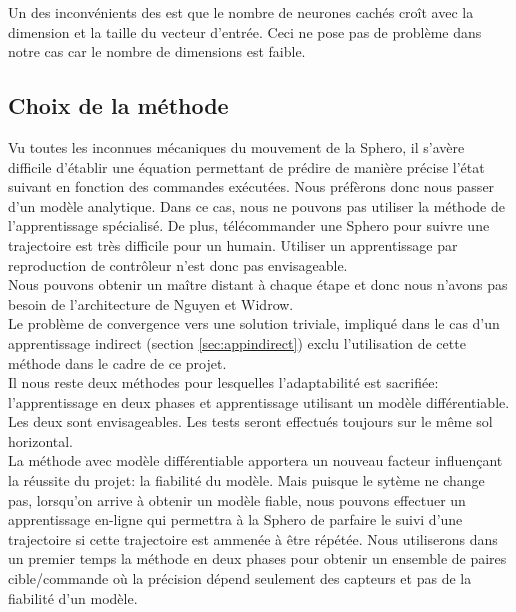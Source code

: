 \documentclass[12pt,a4paper,oneside, titlepage]{article}
\begin{document}
Un des inconvénients des \rbf est que le nombre de neurones cachés croît avec la dimension et la taille du vecteur d'entrée.
Ceci ne pose pas de problème dans notre cas car le nombre de dimensions est faible.

\subsection{Choix de la méthode}
Vu toutes les inconnues mécaniques du mouvement de la Sphero, il s'avère difficile d'établir une équation permettant de prédire de manière précise l'état suivant en fonction des commandes exécutées.
Nous préfèrons donc nous passer d'un modèle analytique.
Dans ce cas, nous ne pouvons pas utiliser la méthode de l'apprentissage spécialisé.
De plus, télécommander une Sphero pour suivre une trajectoire est très difficile pour un humain.
Utiliser un apprentissage par reproduction de contrôleur n'est donc pas envisageable.\\
Nous pouvons obtenir un maître distant à chaque étape et donc nous n'avons pas besoin de l'architecture de Nguyen et Widrow.\\
Le problème de convergence vers une solution triviale, impliqué dans le cas d'un apprentissage indirect (section \ref{sec:appindirect}) exclu l'utilisation de cette méthode dans le cadre de ce projet.\\

Il nous reste deux méthodes pour lesquelles l'adaptabilité est sacrifiée: l'apprentissage en deux phases et apprentissage utilisant un modèle différentiable.
Les deux sont envisageables. Les tests seront effectués toujours sur le même sol horizontal.\\

La méthode avec modèle différentiable apportera un nouveau facteur influençant la réussite du projet: la fiabilité du modèle.
Mais puisque le sytème ne change pas, lorsqu'on arrive à obtenir un modèle fiable, nous pouvons effectuer un apprentissage en-ligne qui permettra à la Sphero de parfaire le suivi d'une trajectoire si cette trajectoire est ammenée à être répétée.
Nous utiliserons dans un premier temps la méthode en deux phases pour obtenir un ensemble de paires cible/commande où la précision dépend seulement des capteurs et pas de la fiabilité d'un modèle.
\end{document}
